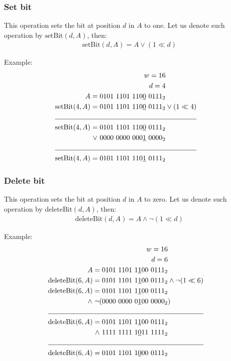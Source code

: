 \subsubsection{Set bit}
This operation sets the bit at position $d$ in $A$ to one. Let us denote such operation by $\text{setBit}(d, A)$, then:
\begin{align*}
    \text{setBit}(d, A) = A \vee (1 \ll d)
\end{align*}

Example:
\begin{align*}
    w = 16\\
    d = 4\\
    A = 0101\ 1101\ 110\underline{0}\ 0111_2& \\
    \text{setBit}(4,A) = 0101\ 1101\ 110\underline{0}\ 0111_2& \vee (1 \ll 4) \\
    \cline{1-2}
    \text{setBit}(4,A) = 0101\ 1101\ 110\underline{0}\ 0111_2& \\
    \vee\  0000\ 0000\ 000\underline{1}\ 0000_2& \\
    \cline{1-2}
    \text{setBit}(4,A) = 0101\ 1101\ 110\underline{1}\ 0111_2&
\end{align*}

\subsubsection{Delete bit}
This operation sets the bit at position $d$ in $A$ to zero. Let us denote such operation by $\text{deleteBit}(d, A)$, then:
\begin{align*}
    \text{deleteBit}(d, A) = A \wedge \neg(1 \ll d)
\end{align*}

Example:
\begin{align*}
    w = 16\\
    d = 6\\
    A = 0101\ 1101\ 1\underline{1}00\ 0111_2& \\
    \text{deleteBit}(6,A) = 0101\ 1101\ 1\underline{1}00\ 0111_2& \wedge \neg(1 \ll 6) \\
    \text{deleteBit}(6,A) = 0101\ 1101\ 1\underline{1}00\ 0111_2&\\
    \wedge\ \neg(0000\ 0000\ 0\underline{1}00\ 0000_2&) \\
    \cline{1-2}
    \text{deleteBit}(6,A) = 0101\ 1101\ 1\underline{1}00\ 0111_2& \\
    \wedge\ 1111\ 1111\ 1\underline{0}11\ 1111_2 \\
    \cline{1-2}
    \text{deleteBit}(6,A) = 0101\ 1101\ 1\underline{0}00\ 0111_2&
\end{align*}

